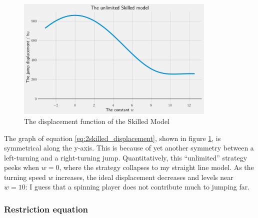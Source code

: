 \documentclass[a4paper,12pt]{article}
\begin{document}
\begin{figure}[H]
    \centering
    \includegraphics[width=0.85\textwidth]{assets/skilled_displacement.png}
    \caption{The displacement function of the Skilled Model}
    \label{fig:skilled_displacement}

\end{figure}
The graph of equation \ref{eq:2skilled_displacement}, shown in figure \ref{fig:skilled_displacement}, is symmetrical along the y-axis. This is because of yet another symmetry between a left-turning and a right-turning jump. Quantitatively, this ``unlimited'' strategy peeks when $w=0$, where the strategy collapses to my straight line model. As the turning speed $w$ increases, the ideal displacement decreases and levels near $w=10$: I guess that a spinning player does not contribute much to jumping far.

\subsubsection{Restriction equation}










%
%
%
%

\nocite{*}
\newpage
\printbibliography
\end{document}
